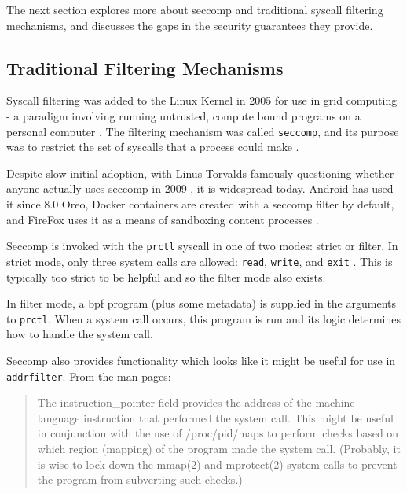 The next section explores more about seccomp and traditional syscall
filtering mechanisms, and discusses the gaps in the security guarantees they
provide.

\subsection{Traditional Filtering Mechanisms}

Syscall filtering was added to the Linux Kernel in 2005 for use in grid
computing - a paradigm involving running untrusted, compute bound programs on a
personal computer \cite{GRID_COMPUTING_INTRO}. The
filtering mechanism was called \texttt{seccomp}, and its purpose was to
restrict the set of syscalls that a process could make \cite{arcangeli_seccomp_2005}.

Despite slow initial adoption, with Linus Torvalds famously questioning whether
anyone actually uses seccomp in 2009 \cite{TORVALDS_ANYONE_USES_SECCOMP}, it is
widespread today. Android has used it since 8.0 Oreo, Docker containers are
created with a seccomp filter by default, and FireFox uses it as a means of
sandboxing content processes \cite{android_seccomp_oreo, docker_seccomp,
firefox_seccomp}.

Seccomp is invoked with the \texttt{prctl} syscall in one of two modes: strict
or filter. In strict mode, only three system calls are allowed: \texttt{read},
\texttt{write}, and \texttt{exit} \cite{MAN_PAGES_SECCOMP}. This is typically
too strict to be helpful and so the filter mode also exists.

In filter mode, a \ac{bpf} program (plus some metadata) is supplied in the arguments to
\texttt{prctl}. When a system call occurs, this program is run and its logic
determines how to handle the system call. 

Seccomp also provides functionality which looks like it might be useful for use in
\texttt{addrfilter}. From the man pages:

\begin{quote}
    The instruction\_pointer field provides the address of the machine-
    language instruction that performed the system call.  This might
    be useful in conjunction with the use of /proc/pid/maps to perform
    checks based on which region (mapping) of the program made the
    system call.  (Probably, it is wise to lock down the mmap(2) and
    mprotect(2) system calls to prevent the program from subverting
    such checks.)
\end{quote}


